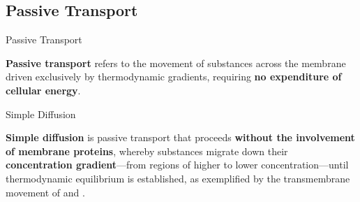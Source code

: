 \documentclass[10pt]{article}
\begin{document}
  \subsection{Passive Transport}

    \begin{core}{Passive Transport}

      \textbf{Passive transport} refers to the movement of substances across the membrane driven exclusively by thermodynamic gradients, requiring \textbf{no expenditure of cellular energy}.

    \end{core}

    \begin{core}{Simple Diffusion}

      \textbf{Simple diffusion} is passive transport that proceeds \textbf{without the involvement of membrane proteins}, whereby substances migrate down their \textbf{concentration gradient}---from regions of higher to lower concentration---until thermodynamic equilibrium is established, as exemplified by the transmembrane movement of  and .


    \end{core}
\end{document}
